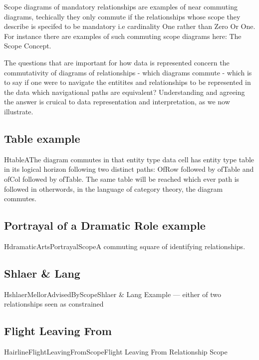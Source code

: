 Scope diagrams of mandatory relationships are examples of near commuting diagrams, techically they only commute if the relationships whose scope they describe is specifed to be mandatory i.e cardinality One rather than Zero Or One. For instance there are examples of such commuting scope diagrams here: The Scope Concept.

The questions that are important for how data is represented concern the commutativity of diagrams of relationships - which diagrams commute - which is to say if one were to navigate the entitites and relationships to be represented in the data which navigational paths are equivalent? Understanding and agreeing the answer is cruical to data representation and interpretation, as we now illustrate.

\subsection{Table example}
\begin{erboxedFigure}{H}{tableA}{The diagram commutes in that entity type data cell has entity type table in its logical horizon following two distinct paths: OfRow followed by ofTable and ofCol followed by ofTable. The same table will be reached which ever path is followed in otherwords, in the language of category theory, the diagram commutes.}

\end{erboxedFigure}

\subsection{Portrayal of a Dramatic Role example}
\begin{erboxedFigure}{H}{dramaticArtsPortrayalScope}{A commuting square of identifying relationships.}

\end{erboxedFigure}

\subsection{Shlaer \& Lang}
\begin{erboxedFigure}{H}{shlaerMellorAdvisedByScope}{Shlaer \& Lang Example --- either of two relationships seen as constrained}

\end{erboxedFigure}

\subsection{Flight Leaving From}
\begin{erboxedFigure}{H}{airlineFlightLeavingFromScope}{Flight Leaving From Relationship Scope}

\end{erboxedFigure}

